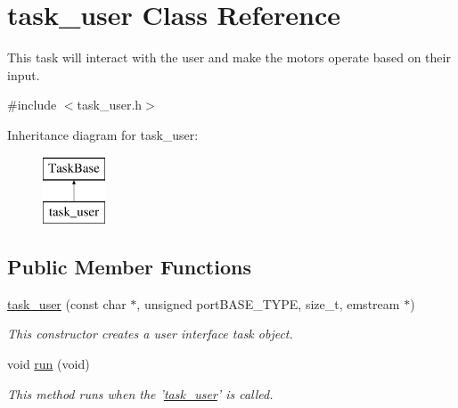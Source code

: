 \hypertarget{classtask__user}{\section{task\-\_\-user Class Reference}
\label{classtask__user}
}


This task will interact with the user and make the motors operate based on their input.  




{\ttfamily \#include $<$task\-\_\-user.\-h$>$}

Inheritance diagram for task\-\_\-user\-:\begin{figure}[H]
\begin{center}
\leavevmode
\includegraphics[height=2.000000cm]{classtask__user}
\end{center}
\end{figure}
\subsection*{Public Member Functions}
\begin{DoxyCompactItemize}
\item 
\hyperlink{classtask__user_a3aba77563b375bb14838800608da48bc}{task\-\_\-user} (const char $\ast$, unsigned port\-B\-A\-S\-E\-\_\-\-T\-Y\-P\-E, size\-\_\-t, emstream $\ast$)
\begin{DoxyCompactList}\small\item\em This constructor creates a user interface task object. \end{DoxyCompactList}\item 
void \hyperlink{classtask__user_adca6429d57be25e8d411414fc8ad75af}{run} (void)
\begin{DoxyCompactList}\small\item\em This method runs when the '\hyperlink{classtask__user}{task\-\_\-user}' is called. \end{DoxyCompactList}\end{DoxyCompactItemize}
